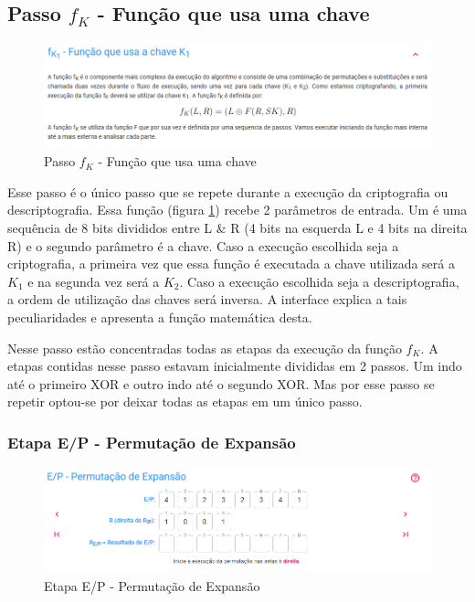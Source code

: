 \subsection{Passo \(f_K\) - Função que usa uma chave}

\begin{figure}[H]
    \centering
    \caption{Passo \(f_K\) - Função que usa uma chave}
    \label{fig:uifk1}
    \includegraphics[width=1\linewidth]{UI/UIFK1.png}
\end{figure}

Esse passo é o único passo que se repete durante a execução da criptografia ou descriptografia. Essa função (figura \ref{fig:uifk1}) recebe 2 parâmetros de entrada. Um é uma sequência de 8 bits divididos entre L \& R (4 bits na esquerda L e 4 bits na direita R) e o segundo parâmetro é a chave. Caso a execução escolhida seja a criptografia, a primeira vez que essa função é executada a chave utilizada será a \(K_1\) e na segunda vez será a \(K_2\). Caso a execução escolhida seja a descriptografia, a ordem de utilização das chaves será inversa. A interface explica a tais peculiaridades e apresenta a função matemática desta.

Nesse passo estão concentradas todas as etapas da execução da função \(f_K\). A etapas contidas nesse passo estavam inicialmente divididas em 2 passos. Um indo até o primeiro XOR e outro indo até o segundo XOR. Mas por esse passo se repetir optou-se por deixar todas as etapas em um único passo.

\subsubsection{Etapa E/P - Permutação de Expansão}

\begin{figure}[H]
    \centering
    \caption{Etapa E/P - Permutação de Expansão}
    \label{fig:uiep}
    \includegraphics[width=1\linewidth]{UI/UIEP.png}
\end{figure}

